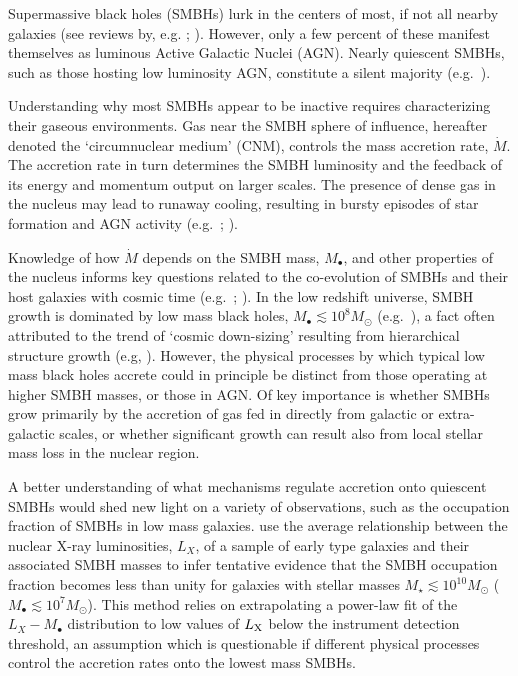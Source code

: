 \documentclass[usenatbib,fleqn]{mn2e}
\newcommand{\Mbh}[1][]{M_{\bullet#1}}
\begin{document}
Supermassive black holes (SMBHs) lurk in the centers of most, if not
all nearby galaxies (see reviews by,
e.g. \citealt{KormendyRichstone:1995a};
\citealt{FerrareseFord:2005a}). However, only a few percent of these
manifest themselves as luminous Active Galactic Nuclei (AGN).  Nearly
quiescent SMBHs, such as those hosting low luminosity AGN, constitute
a silent majority (e.g.~\citealt{Ho:2009a}).

Understanding why most SMBHs appear to be inactive requires
characterizing their gaseous environments.  Gas near the SMBH sphere
of influence, hereafter denoted the `circumnuclear medium' (CNM),
controls the mass accretion rate, $\dot{M}$.  The accretion rate in
turn determines the SMBH luminosity and the feedback of its energy and
momentum output on larger scales.  The presence of dense gas in the
nucleus may lead to runaway cooling, resulting in bursty episodes of
star formation and AGN activity (e.g.~\citealt{Ciotti&Ostriker07};
\citealt{Ciotti+10}).

Knowledge of how $\dot{M}$ depends on the SMBH mass, $\Mbh$, and other
properties of the nucleus informs key questions related to the
co-evolution of SMBHs and their host galaxies with cosmic time
(e.g.~\citealt{Kormendy&Ho13}; \citealt{HeckmanBest:2014a}).  In the
low redshift universe, SMBH growth is dominated by low mass black
holes, $M_{\bullet} \lesssim 10^{8}M_{\odot}$
(e.g.~\citealt{Heckman+04}), a fact often attributed to the trend of
`cosmic down-sizing' resulting from hierarchical structure growth
(e.g, \citealt{Gallo+08}).  However, the physical processes by which typical
low mass black holes accrete could in principle be distinct from those
operating at higher SMBH masses, or those in AGN.  Of key importance is whether SMBHs grow primarily by the
accretion of gas fed in directly from galactic or extra-galactic
scales, or whether significant growth can result also from local
stellar mass loss in the nuclear region.

A better understanding of what mechanisms regulate accretion onto
quiescent SMBHs would shed new light on a variety of observations,
such as the occupation fraction of SMBHs in low mass galaxies.
\citet{Miller+15} use the average relationship between the nuclear
X-ray luminosities, $L_{X}$, of a sample of early type galaxies and
their associated SMBH masses to infer tentative evidence that the SMBH
occupation fraction becomes less than unity for galaxies with stellar
masses $M_{\star} \lesssim 10^{10}M_{\odot}$ ($M_{\bullet} \lesssim
10^{7}M_{\odot}$).  This method relies on extrapolating a power-law
fit of the $L_X-\Mbh$ distribution to low values of $L_{\rm X}$ below
the instrument detection threshold, an assumption which is
questionable if different physical processes control the accretion
rates onto the lowest mass SMBHs.
\end{document}
